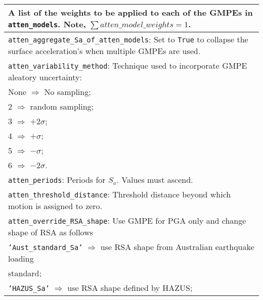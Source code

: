 \documentclass[a4paper, 12pt]{report}
\begin{document}
\begin{tabular}{|p{\textwidth}|}
A list of the weights to be applied to each of the GMPEs in
\texttt{atten\_models}.  Note, $\sum  atten\_model\_weights=1$. \\
\hline
\vspace{0.1em} \texttt{atten\_aggregate\_Sa\_of\_atten\_models}: 
Set to
\texttt{True} to collapse the surface acceleration's when
multiple GMPEs are used.\\
\hline
\vspace{0.1em} \texttt{atten\_variability\_method}: 
 Technique used to
incorporate GMPE aleatory uncertainty: \\
 \hspace{0.5em} None $\Rightarrow$ No sampling; \\
 \hspace{0.5em} 2 $\Rightarrow$ random sampling; \\
 \hspace{0.5em} 3 $\Rightarrow$ $+2\sigma$; \\
 \hspace{0.5em} 4 $\Rightarrow$ $+\sigma$; \\
 \hspace{0.5em} 5 $\Rightarrow$ $-\sigma$; \\
 \hspace{0.5em} 6 $\Rightarrow$ $-2\sigma$.\\
\hline
\vspace{0.1em} \texttt{atten\_periods}: 
Periods for $S_a$. Values must ascend. \\
\hline
\vspace{0.1em} \texttt{atten\_threshold\_distance}: 
Threshold distance beyond which motion is assigned to zero. \\
\hline
\vspace{0.1em} \texttt{atten\_override\_RSA\_shape}: 
Use GMPE for PGA only and change shape of RSA as follows\\
 \hspace{0.5em} \texttt{'Aust\_standard\_Sa'} $\Rightarrow$
use RSA shape from Australian earthquake loading \\
\hspace{11em} standard; \\
 \hspace{0.5em} \texttt{'HAZUS\_Sa'}  $\Rightarrow$ use RSA shape defined by HAZUS;\\
\hline
\end{tabular}
\end{document}
